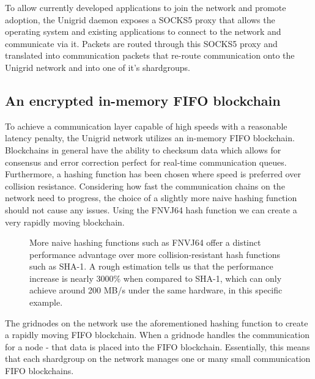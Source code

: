 \documentclass[10pt,a4paper,final]{article}
\begin{document}
\noindent To allow currently developed applications to join the network and promote adoption, the Unigrid daemon exposes a SOCKS5 proxy that allows the operating system and existing applications to connect to the network and communicate via it. Packets are routed through this SOCKS5 proxy and translated into communication packets that re-route communication onto the Unigrid network and into one of it's \glspl{shardgroup}.

\subsection{An encrypted in-memory FIFO blockchain}
\label{section:fifo}
To achieve a communication layer capable of high speeds with a reasonable latency penalty, the Unigrid network utilizes an in-memory FIFO blockchain. Blockchains in general have the ability to checksum data which allows for consensus and error correction perfect for real-time communication queues. Furthermore, a hashing function has been chosen where speed is preferred over collision resistance. Considering how fast the communication chains on the network need to progress, the choice of a slightly more naive hashing function should not cause any issues. Using the FNVJ64 hash function we can create a very rapidly moving blockchain.

\begin{figure}[H]
\centering
{}
\caption{More naive hashing functions such as FNVJ64 offer a distinct performance advantage over more collision-resistant hash functions such as SHA-1. A rough estimation tells us that the performance increase is nearly 3000\% when compared to SHA-1, which can only achieve around 200 MB/s \cite{greenrobot} under the same hardware, in this specific example.}
\end{figure}

\noindent The \glspl{gridnode} on the network use the aforementioned hashing function to create a rapidly moving FIFO blockchain. When a \gls{gridnode} handles the communication for a node - that data is placed into the FIFO blockchain. Essentially, this means that each \gls{shardgroup} on the network  manages one or many small communication FIFO blockchains.
\end{document}
